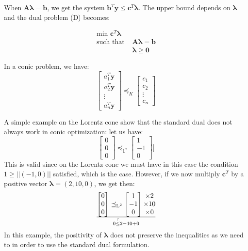 \documentclass[11pt,a4paper]{article}
\begin{document}
When $\boldsymbol{A\lambda}=\boldsymbol{b}$, we get the system $\boldsymbol{b}^T \boldsymbol{y} \leq \boldsymbol{c}^T \boldsymbol{\lambda}$. The upper bound depends on $\boldsymbol{\lambda}$ and the dual problem (D) becomes:

\begin{align*}
\textrm{min }\boldsymbol{c}^T \boldsymbol{\lambda}&\\
  \textrm{such that }&\boldsymbol{A\lambda}=\boldsymbol{b}\\
             &\boldsymbol{\lambda} \geq \boldsymbol{0}
\end{align*}

In a conic problem, we have:
\[\begin{bmatrix}
 a_1^T \boldsymbol{y}\\
 a_2^T \boldsymbol{y}\\
 \vdots\\
 a_n^T \boldsymbol{y}
\end{bmatrix} \preceq_K \begin{bmatrix}
 c_1\\
 c_2\\
 \vdots\\
 c_n
\end{bmatrix}\]

A simple example on the Lorentz cone show that the standard dual does not always work in conic optimization: let us have:
\[\begin{bmatrix}
 0\\
 0\\
 0
\end{bmatrix} \preceq_{\mathbb{L}^2} \begin{bmatrix}
 1\\
 -1\\
 0
\end{bmatrix}]\]
This is valid since on the Lorentz cone we must have in this case the condition $1\geq ||(-1,0)||$ satisfied, which is the case. However, if we now multiply $\boldsymbol{c}^T$ by a positive vector $\boldsymbol{\lambda}=(2,10,0)$, we get then:
\[\begin{bmatrix}
 0\\
 0\\
 0
\end{bmatrix} \preceq_{\mathbb{L}^2} \begin{bmatrix}
 1\\
 -1\\
 0
\end{bmatrix}\begin{matrix}
 \times 2\\
 \times 10\\
 \times 0
\end{matrix}\over
0 \stackrel{?}{\leq} 2-10+0\]
In this example, the positivity of $\boldsymbol{\lambda}$ does not preserve the inequalities as we need to in order to use the standard dual formulation.\\
\end{document}
